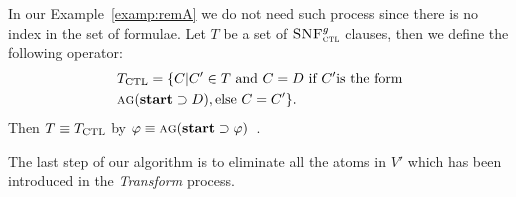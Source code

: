 \documentclass{article}
\begin{document}
In our Example~\ref{examp:remA} we do not need such  process since there is no index in the set of formulae.
Let $T$ be a set of ${\textsc{SNF}_{\textsc{ctl}}^g}$ clauses, then we define the following operator:
\begin{align*}
&T_{\textrm{CTL}} = \{C|C'\in T\ \mbox{and}\ C = D \ \mbox{if}\ C' \mbox{is the form}\\
& \textsc{a}\textsc{g}(\textbf{start}\supset D), \mbox{else}\ C= C'\}.
\end{align*}
Then $T \equiv T_{\textrm{CTL}}$ by $\varphi \equiv \textsc{a} \textsc{g} (\textbf{start} \supset \varphi)$~\cite{bolotov2000clausal}.


The last step of our algorithm is to eliminate all the atoms in $V'$ which has been introduced in the \emph{Transform} process.
\end{document}
